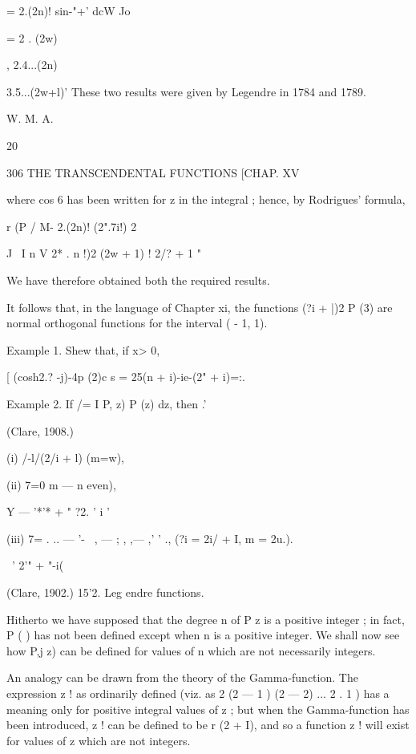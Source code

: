 {= 2.(2n)! sin-"+' dcW 
Jo 



= 2 . (2w) 



, 2.4...(2n) 



3.5...(2w+l)' 
These two results were given by Legendre in 1784 and 1789. 



W. M. A. 



20 



306 THE TRANSCENDENTAL FUNCTIONS [CHAP. XV 

where cos 6 has been written for z in the integral ; hence, by Rodrigues' 
formula, 

r (P / M-  2.(2n)! (2".7i!)  2 



J \   I n V    2*  . n !)2 (2w + 1) ! 2/? + 1 " 

We have therefore obtained both the required results. 

It follows that, in the language of Chapter xi, the functions (?i + |)2 P (3) are normal 
orthogonal functions for the interval ( - 1, 1). 

Example 1. Shew that, if x> 0, 

[  (cosh2.? -j)-4p (2)c s = 25(n + i)-ie-(2" + i)=:. 



Example 2. If /= I P,   z) P  (z) dz, then 
.' 



(Clare, 1908.) 



(i) /-l/(2/i + l) (m=w), 

(ii) 7=0  m — n even), 

Y — '*'* + " ?2. '  i ' 

(iii) 7=  .  .. — '-~ , — ; , ,— ,'   ' ., (?i = 2i/ + I, m = 2u.). 

\ ' 2'" + "-i(%

(Clare, 1902.) 
15'2. Leg endre functions. 

Hitherto we have supposed that the degree n of P   z  is a positive 
integer ; in fact, P  ( ) has not been defined except when n is a positive 
integer. We shall now see how P,j  z) can be defined for values of n which 
are not necessarily integers. 

An analogy can be drawn from the theory of the Gamma-function. The expression 
z ! as ordinarily defined (viz. as 2 (2 — 1 ) (2 — 2) ... 2 . 1 ) has a meaning only for positive 
integral values of z ; but when the Gamma-function has been introduced, z ! can be defined 
to be r (2 + I), and so a function z ! will exist for values of z which are not integers. 

}
